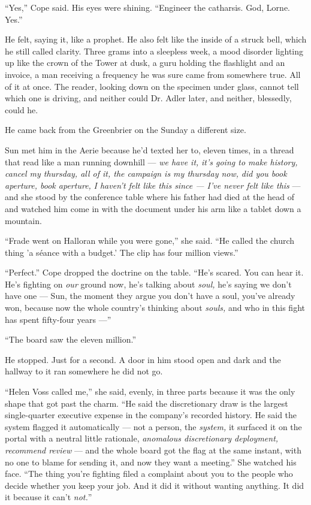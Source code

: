 \documentclass[11pt,openany]{book}
\newcommand{\scenebreak}{\par\vspace{0.5\baselineskip}\begin{center}\textasteriskcentered\quad\textasteriskcentered\quad\textasteriskcentered\end{center}\vspace{0.5\baselineskip}\par}
\begin{document}
``Yes,'' Cope said. His eyes were shining. ``Engineer the catharsis. God, Lorne. Yes.''

He felt, saying it, like a prophet. He also felt like the inside of a struck bell, which he still called clarity. Three grams into a sleepless week, a mood disorder lighting up like the crown of the Tower at dusk, a guru holding the flashlight and an invoice, a man receiving a frequency he was sure came from somewhere true. All of it at once. The reader, looking down on the specimen under glass, cannot tell which one is driving, and neither could Dr. Adler later, and neither, blessedly, could he.


\scenebreak


He came back from the Greenbrier on the Sunday a different size.

Sun met him in the Aerie because he'd texted her to, eleven times, in a thread that read like a man running downhill --- \textit{we have it,} \textit{it's going to make history,} \textit{cancel my thursday, all of it, the campaign is my thursday now,} \textit{did you book aperture, book aperture,} \textit{I haven't felt like this since --- I've never felt like this} --- and she stood by the conference table where his father had died at the head of and watched him come in with the document under his arm like a tablet down a mountain.

``Frade went on Halloran while you were gone,'' she said. ``He called the church thing 'a séance with a budget.' The clip has four million views.''

``Perfect.'' Cope dropped the doctrine on the table. ``He's scared. You can hear it. He's fighting on \textit{our} ground now, he's talking about \textit{soul,} he's saying we don't have one --- Sun, the moment they argue you don't have a soul, you've already won, because now the whole country's thinking about \textit{souls,} and who in this fight has spent fifty-four years ---''

``The board saw the eleven million.''

He stopped. Just for a second. A door in him stood open and dark and the hallway to it ran somewhere he did not go.

``Helen Voss called me,'' she said, evenly, in three parts because it was the only shape that got past the charm. ``He said the discretionary draw is the largest single-quarter executive expense in the company's recorded history. He said the system flagged it automatically --- not a person, the \textit{system,} it surfaced it on the portal with a neutral little rationale, \textit{anomalous discretionary deployment, recommend review} --- and the whole board got the flag at the same instant, with no one to blame for sending it, and now they want a meeting.'' She watched his face. ``The thing you're fighting filed a complaint about you to the people who decide whether you keep your job. And it did it without wanting anything. It did it because it can't \textit{not.}''
\end{document}
